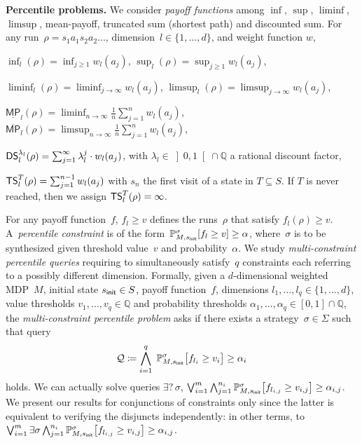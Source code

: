 \documentclass{llncs}
\newcommand{\states}{\ensuremath{S} }
\newcommand{\initState}{\ensuremath{s_{{\sf init}}} }
\newcommand{\markovProcess}{\ensuremath{{M} }}
\newcommand{\strat}{\ensuremath{\sigma} }
\newcommand*{\pr}{\mathbb{P}}
\newcommand*{\mpsup}{\ensuremath{\overline{\mathsf{MP}}}}
\newcommand*{\mpinf}{\ensuremath{\underline{\mathsf{MP}}}}
\newcommand{\truncatedTarget}{\ensuremath{T} }
\newcommand{\truncatedSum}[1]{\ensuremath{{\sf TS}^{#1}} }
\newcommand{\discSum}[1]{\ensuremath{{\sf DS}^{#1}} }
\newcommand{\discount}{\ensuremath{\lambda} }
\newcommand{\dimension}{\ensuremath{d} }
\newcommand{\queries}{\ensuremath{q} }
\newcommand{\rat}{\ensuremath{\mathbb{Q}} }
\newcommand{\strats}{\ensuremath{\Sigma} }
\newcommand{\query}{\ensuremath{\mathcal{Q}} }
\begin{document}
\label{sec:percentilesProblem}
\smallskip\noindent\textbf{Percentile problems.} 
We consider \textit{payoff functions} among $\inf$, $\sup$, $\liminf$,
$\limsup$, mean-payoff, truncated sum (shortest path) and discounted sum. For
any run~$\rho=s_1a_1s_2a_2\ldots$, dimension~$l \in \{1,\ldots,d\}$, and weight
function $w$,
\vspace{-1mm}
\begin{itemize*}
\item
  $\inf_l(\rho) = \inf_{j\geq 1} w_l(a_j)$,
  $\sup_l(\rho) = \sup_{j\geq 1} {w_l(a_j)}$,
\item
  $\liminf_l(\rho) = \liminf_{j \rightarrow \infty} w_l(a_j)$,
  $\limsup_l(\rho) = \limsup_{j \rightarrow \infty} w_l(a_j)$,
\item 
  $\mpinf_l(\rho) = \liminf_{n \rightarrow \infty} \frac{1}{n} \sum_{j=1}^n w_l(a_j)$,   $\mpsup_l(\rho) = \limsup_{n \rightarrow \infty} \frac{1}{n} \sum_{j=1}^n w_l(a_j)$,
\item
  $\discSum{\discount_l}_l(\rho) = \sum_{j=1}^{\infty} \discount_l^{j}\cdot w_l(a_j)$, with $\discount_l \in \left] 0, 1\right[ \cap \rat$ a rational discount factor,
\item 
$\truncatedSum{\truncatedTarget}_l(\rho) = \sum_{j=1}^{n-1} w_l(a_j)$ with $s_{n}$ the first visit of a state in $\truncatedTarget \subseteq \states$. If $\truncatedTarget$ is never reached, then we assign $\truncatedSum{\truncatedTarget}_l(\rho) = \infty$.
\end{itemize*}
\vspace{-1mm}

For any payoff function~$f$, $f_l \geq v$ defines the runs~$\rho$ that satisfy $f_l(\rho)\geq v$.
A~\emph{percentile constraint} is of the form~$\pr_{M,\initState}^\sigma[ f_{l} \geq v] \geq \alpha$, where~$\sigma$ is to be synthesized given threshold value~$v$ and probability~$\alpha$. We study \emph{multi-constraint percentile queries} requiring to simultaneously satisfy~$q$ constraints each referring to a possibly different dimension.
Formally, given a $\dimension$-dimensional weighted MDP~$\markovProcess$, initial state $\initState \in \states$, payoff function~$f$,
dimensions $l_1,\ldots,l_q \in \{1,\ldots,\dimension\}$, value thresholds $v_1,\ldots,v_\queries \in \rat$ and probability thresholds $\alpha_1,\ldots, \alpha_\queries \in [0,1] \cap \rat$, the \emph{multi-constraint percentile problem} asks if there exists a strategy~$\strat \in \strats$ such that query
\[
\query \coloneqq \bigwedge_{i = 1}^{q}\; \pr_{M,\initState}^\strat\big[f_{l_{i}} \geq v_i\big] \geq
	\alpha_i
	\]
	holds. We can actually solve queries
$\exists?\, \sigma$, $\bigvee_{i=1}^m \bigwedge_{j=1}^{n_i} \pr_{M,\initState}^\strat\big[f_{l_{i,j}} \geq v_{i,j} \big]\geq \alpha_{i,j}$.
We present our results for conjunctions of constraints only since
the latter is equivalent to verifying the disjuncts independently:
in other terms, to
$\bigvee_{i=1}^m \exists \sigma \bigwedge_{j=1}^{n_i} \pr_{M,\initState}^\strat\big[f_{l_{i,j}} \geq v_{i,j} \big]\geq \alpha_{i,j}$.
\end{document}
